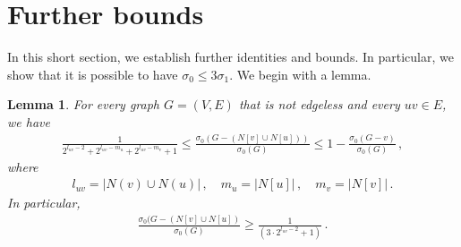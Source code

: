 \documentclass[a4paper,12pt]{amsart}
\newtheorem{lemma}{Lemma}
\theoremstyle{remark}
\begin{document}

\section{Further bounds} \label{Sect:Furth}

In this short section, we establish further identities and bounds. In particular, we show that it is possible to have $\sigma_0 \leq 3 \sigma_1$. We begin with a lemma.

\begin{lemma}\label{lem:help}
For every graph $G=(V,E)$ that is not edgeless and every $uv \in E$, we have 
\begin{align*}
\frac{1}{2^{l_{uv}-2}+2^{l_{uv}-m_u}+2^{l_{uv}-m_v}+1}\leq \frac{\sigma_0(G-(N[v]\cup N[u]))}{\sigma_0(G)}\leq 1- \frac{\sigma_0(G-v)}{\sigma_0(G)}\,,
\end{align*}
where
\begin{align*}
l_{uv}=|N(v)\cup N(u)|\,, \quad m_u=|N[u]|\,, \quad m_v=| N[v]|\,.
\end{align*}
In particular, 
\begin{align*}
\frac{\sigma_0(G-(N[v]\cup N[u])}{\sigma_0(G)}\geq \frac{1}{(3\cdot 2^{l_{uv}-2}+1)}\,.
\end{align*}

\end{lemma}
\end{document}
